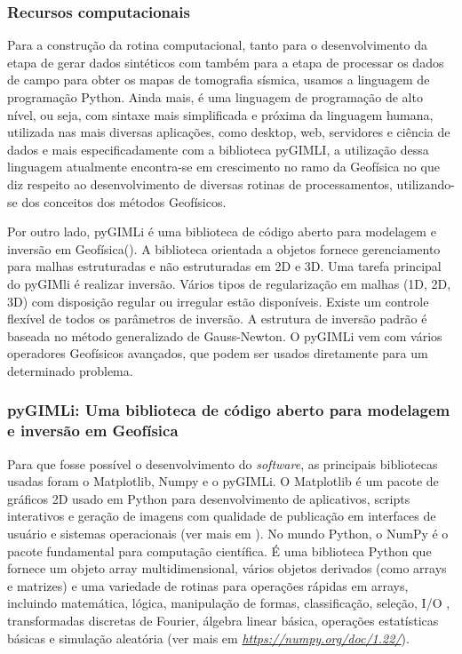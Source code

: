 \documentclass[a4paper, 12 pt]{article} %
\begin{document}

\subsubsection{Recursos computacionais}

Para a construção da rotina computacional, tanto para o desenvolvimento da etapa de gerar dados sintéticos com também para a etapa de processar os dados de campo para obter os mapas de tomografia sísmica, usamos a linguagem de programação Python. Ainda mais, é uma linguagem de programação de alto nível, ou seja, com sintaxe mais simplificada e próxima da linguagem humana, utilizada nas mais diversas aplicações, como desktop, web, servidores e ciência de dados e mais especificadamente com a biblioteca pyGIMLI, a utilização dessa linguagem atualmente encontra-se em crescimento no ramo da Geofísica no que diz respeito ao desenvolvimento de diversas rotinas de processamentos, utilizando-se dos conceitos dos métodos Geofísicos.


Por outro lado, pyGIMLi é uma biblioteca de código aberto para modelagem e inversão em Geofísica(\citealp{Ruecker2017}). A biblioteca orientada a objetos fornece gerenciamento para malhas estruturadas e não estruturadas em 2D e 3D. Uma tarefa principal do pyGIMli é realizar inversão. Vários tipos de regularização em malhas (1D, 2D, 3D) com disposição regular ou irregular estão disponíveis. Existe um controle flexível de todos os parâmetros de inversão. A estrutura de inversão padrão é baseada no método generalizado de Gauss-Newton. O pyGIMLi vem com vários operadores Geofísicos avançados, que podem ser usados diretamente para um determinado problema.


\subsubsection{pyGIMLi: Uma biblioteca de código aberto para modelagem e inversão em Geofísica}

Para que fosse possível o desenvolvimento do \textit{software}, as principais bibliotecas usadas foram o Matplotlib, Numpy e o pyGIMLi. O Matplotlib é um pacote de gráficos 2D usado em Python para desenvolvimento de aplicativos, scripts interativos e geração de imagens com qualidade de publicação em interfaces de usuário e sistemas operacionais (ver mais em \citealp{matplotlib}). No mundo Python, o NumPy é o pacote fundamental para computação científica. É uma biblioteca Python que fornece um objeto array multidimensional, vários objetos derivados (como arrays e matrizes) e uma variedade de rotinas para operações rápidas em arrays, incluindo matemática, lógica, manipulação de formas, classificação, seleção, I/O , transformadas discretas de Fourier, álgebra linear básica, operações estatísticas básicas e simulação aleatória (ver mais em \textit{\url{https://numpy.org/doc/1.22/}}).
\end{document}
